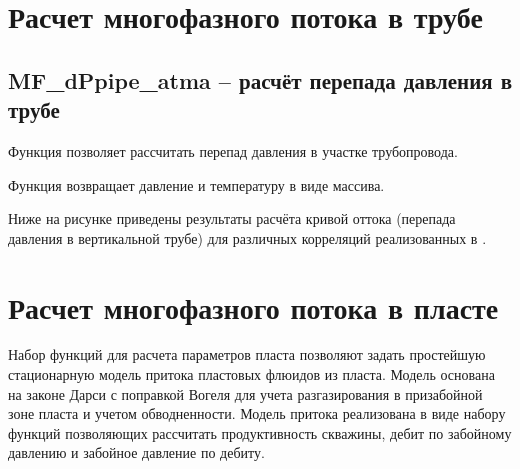 \documentclass[]{scrreprt}
\begin{document}

\newpage
\section{Расчет многофазного потока в трубе}



\subsection{MF\_dPpipe\_atma – расчёт перепада давления в трубе}

Функция позволяет рассчитать перепад давления в участке трубопровода. 

Функция возвращает давление и температуру в виде массива.


Ниже на рисунке приведены результаты расчёта кривой оттока (перепада давления в вертикальной трубе) для различных корреляций реализованных в \unf.

\newcommand{\dPipeDataFile}{data/dPipe.txt}



\newpage
\section{Расчет многофазного потока в пласте}
Набор функций для расчета параметров пласта позволяют задать простейшую стационарную модель притока пластовых флюидов из пласта. Модель основана на законе Дарси с поправкой Вогеля для учета разгазирования в призабойной зоне пласта и учетом обводненности. Модель притока реализована в виде набору функций позволяющих рассчитать продуктивность скважины, дебит по забойному давлению и забойное давление по дебиту.
\end{document}
